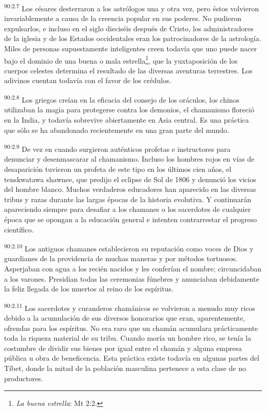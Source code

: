 \documentclass[twoside, 11pt]{book}
\begin{document}
\par
\textsuperscript{90:2.7} Los césares desterraron a los astrólogos una y otra vez, pero éstos volvieron invariablemente a causa de la creencia popular en sus poderes. No pudieron expulsarlos, e incluso en el siglo dieciséis después de Cristo, los administradores de la iglesia y de los Estados occidentales eran los patrocinadores de la astrología. Miles de personas supuestamente inteligentes creen todavía que uno puede nacer bajo el dominio de una buena o mala estrella\footnote{\textit{La buena estrella}: Mt 2:2.}, que la yuxtaposición de los cuerpos celestes determina el resultado de las diversas aventuras terrestres. Los adivinos cuentan todavía con el favor de los crédulos.

\par
\textsuperscript{90:2.8} Los griegos creían en la eficacia del consejo de los oráculos, los chinos utilizaban la magia para protegerse contra los demonios, el chamanismo floreció en la India, y todavía sobrevive abiertamente en Asia central. Es una práctica que sólo se ha abandonado recientemente en una gran parte del mundo.

\par
\textsuperscript{90:2.9} De vez en cuando surgieron auténticos profetas e instructores para denunciar y desenmascarar al chamanismo. Incluso los hombres rojos en vías de desaparición tuvieron un profeta de este tipo en los últimos cien años, el tenskwatawa shawnee, que predijo el eclipse de Sol de 1806 y denunció los vicios del hombre blanco. Muchos verdaderos educadores han aparecido en las diversas tribus y razas durante las largas épocas de la historia evolutiva. Y continuarán apareciendo siempre para desafiar a los chamanes o los sacerdotes de cualquier época que se opongan a la educación general e intenten contrarrestar el progreso científico.

\par
\textsuperscript{90:2.10} Los antiguos chamanes establecieron su reputación como voces de Dios y guardianes de la providencia de muchas maneras y por métodos tortuosos. Asperjaban con agua a los recién nacidos y les conferían el nombre; circuncidaban a los varones. Presidían todas las ceremonias fúnebres y anunciaban debidamente la feliz llegada de los muertos al reino de los espíritus.

\par
\textsuperscript{90:2.11} Los sacerdotes y curanderos chamánicos se volvieron a menudo muy ricos debido a la acumulación de sus diversos honorarios que eran, aparentemente, ofrendas para los espíritus. No era raro que un chamán acumulara prácticamente toda la riqueza material de su tribu. Cuando moría un hombre rico, se tenía la costumbre de dividir sus bienes por igual entre el chamán y alguna empresa pública u obra de beneficencia. Esta práctica existe todavía en algunas partes del Tíbet, donde la mitad de la población masculina pertenece a esta clase de no productores.
\end{document}
